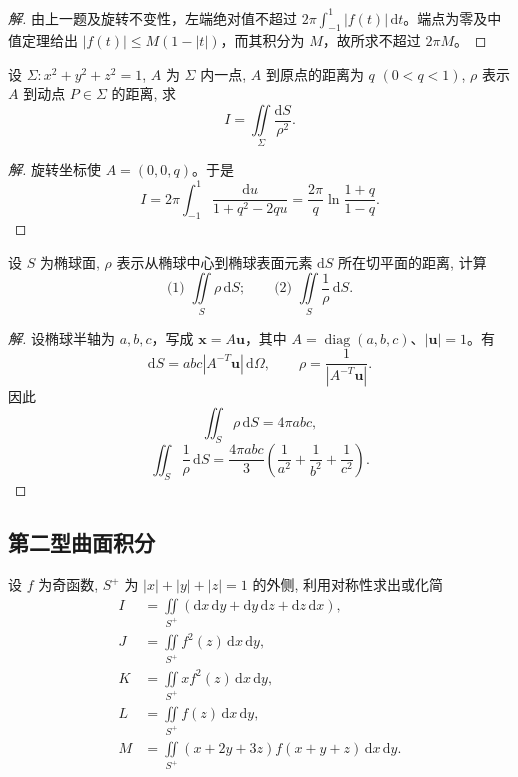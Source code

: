 \documentclass[../../数学分析培优讲义(答案版).tex]{subfiles}
\begin{document}
\begin{proof}[解]
由上一题及旋转不变性，左端绝对值不超过 $2\pi\int_{-1}^1|f(t)|\,\mathrm{d}t$。端点为零及中值定理给出 $|f(t)|\leq M(1-|t|)$，而其积分为 $M$，故所求不超过 $2\pi M$。
\end{proof}

\begin{example}
设 $\Sigma:x^2+y^2+z^2=1$, $A$ 为 $\Sigma$ 内一点, $A$ 到原点的距离为 $q$ $(0<q<1)$, $\rho$ 表示 $A$ 到动点 $P\in\Sigma$ 的距离, 求
\[
    I=\iint\limits_\Sigma\dfrac{\mathrm{d}S}{\rho^2}.
\]
\end{example}

\begin{proof}[解]
旋转坐标使 $A=(0,0,q)$。于是
\[
I=2\pi\int_{-1}^1\dfrac{\mathrm{d}u}{1+q^2-2qu}
=\dfrac{2\pi}{q}\ln\dfrac{1+q}{1-q}.
\]
\end{proof}

\begin{example}
设 $S$ 为椭球面, $\rho$ 表示从椭球中心到椭球表面元素 $\mathrm{d}S$ 所在切平面的距离, 计算
\[
    \text{(1) }\iint\limits_S\rho\,\mathrm{d}S;
    \qquad
    \text{(2) }\iint\limits_S\dfrac{1}{\rho}\,\mathrm{d}S.
\]
\end{example}

\begin{proof}[解]
设椭球半轴为 $a,b,c$，写成 $\bm x=A\bm u$，其中 $A=\operatorname{diag}(a,b,c)$、$|\bm u|=1$。有
\[
\mathrm{d}S=abc|A^{-T}\bm u|\,\mathrm{d}\Omega,\qquad
\rho=\dfrac{1}{|A^{-T}\bm u|}.
\]
因此
\[
\iint_S\rho\,\mathrm{d}S=4\pi abc,
\]
\[
\iint_S\dfrac{1}{\rho}\,\mathrm{d}S
=\dfrac{4\pi abc}{3}\left(\dfrac{1}{a^2}+\dfrac{1}{b^2}+\dfrac{1}{c^2}\right).
\]
\end{proof}

\subsection{第二型曲面积分}

\begin{example}
设 $f$ 为奇函数, $S^+$ 为 $|x|+|y|+|z|=1$ 的外侧, 利用对称性求出或化简
\[
\begin{aligned}
    I&=\iint\limits_{S^+}(\mathrm{d}x\,\mathrm{d}y+\mathrm{d}y\,\mathrm{d}z+\mathrm{d}z\,\mathrm{d}x),\\
    J&=\iint\limits_{S^+}f^2(z)\,\mathrm{d}x\,\mathrm{d}y,\\
    K&=\iint\limits_{S^+}xf^2(z)\,\mathrm{d}x\,\mathrm{d}y,\\
    L&=\iint\limits_{S^+}f(z)\,\mathrm{d}x\,\mathrm{d}y,\\
    M&=\iint\limits_{S^+}(x+2y+3z)f(x+y+z)\,\mathrm{d}x\,\mathrm{d}y.
\end{aligned}
\]
\end{example}
\end{document}
